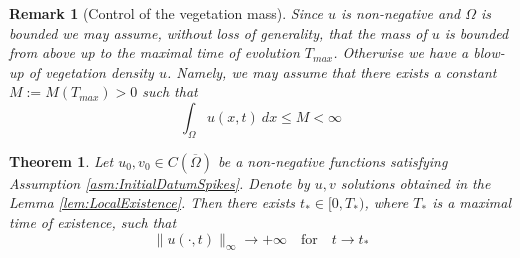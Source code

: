 \documentclass[12pt, a4paper]{article}
\theoremstyle{break}
\newtheorem{thm}{Theorem}[section]
\theoremstyle{break}
\theoremstyle{break}
\theoremstyle{break}
\newtheorem{rem}{Remark}[section]
\theoremstyle{break}
\theoremstyle{break}
\theoremstyle{break}
\begin{document}
\begin{rem}[Control of the vegetation mass]
    Since $u$ is non-negative and $\Omega$ is bounded we may assume, without loss of generality, that the mass of $u$ is bounded from above up to the maximal time of evolution $T_{max}$. Otherwise we have a blow-up of vegetation density $u$. Namely, we may assume that there exists a constant $M := M(T_{max}) > 0$ such that
    \begin{equation}
        \int_\Omega u(x, t)\:dx \leq M < \infty
    \end{equation}
\end{rem}
\begin{thm}
    Let $u_0, v_0 \in C(\overline{\Omega})$ be a non-negative functions satisfying Assumption \ref{asm:InitialDatumSpikes}. Denote by $u, v$ solutions obtained in the Lemma \ref{lem:LocalExistence}. Then there exists $t_* \in [0, T_*)$, where $T_*$ is a maximal time of existence, such that
    \begin{equation}
        \label{EQ:VegetationBlowUp}
        \| u(\cdot, t) \|_\infty \rightarrow +\infty \quad \text{for} \quad t \rightarrow t_*
    \end{equation}
\end{thm}
\end{document}
